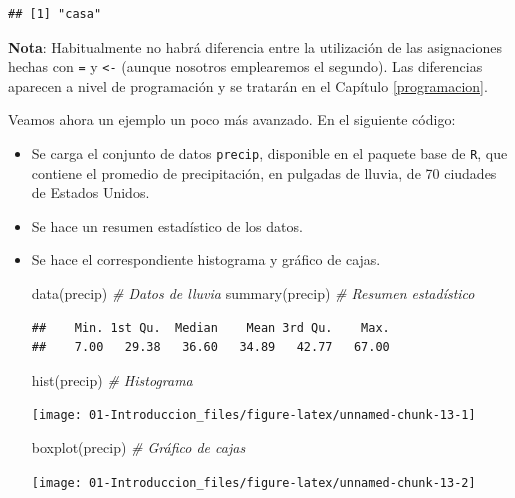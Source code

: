 \documentclass[
]{book}
\newenvironment{Shaded}{\begin{snugshade}}{\end{snugshade}}
\newcommand{\CommentTok}[1]{\textcolor[rgb]{0.56,0.35,0.01}{\textit{#1}}}
\newcommand{\FunctionTok}[1]{\textcolor[rgb]{0.00,0.00,0.00}{#1}}
\newcommand{\NormalTok}[1]{#1}
\theoremstyle{break}
\theoremstyle{nonumberplain}
\begin{document}
\begin{verbatim}
## [1] "casa"
\end{verbatim}

\textbf{Nota}: Habitualmente no habrá diferencia entre la utilización de las asignaciones hechas con \texttt{=} y \texttt{\textless{}-} (aunque nosotros emplearemos el segundo).
Las diferencias aparecen a nivel de programación y se tratarán en el Capítulo \ref{programacion}.

Veamos ahora un ejemplo un poco más avanzado.
En el siguiente código:

\begin{itemize}
\item
  Se carga el conjunto de datos \texttt{precip}, disponible en el paquete base de \texttt{R}, que contiene el promedio de precipitación, en pulgadas de lluvia, de 70 ciudades de Estados Unidos.
\item
  Se hace un resumen estadístico de los datos.
\item
  Se hace el correspondiente histograma y gráfico de cajas.

\begin{Shaded}
\begin{Highlighting}[]
\FunctionTok{data}\NormalTok{(precip)    }\CommentTok{\# Datos de lluvia}
\FunctionTok{summary}\NormalTok{(precip) }\CommentTok{\# Resumen estadístico}
\end{Highlighting}
\end{Shaded}

\begin{verbatim}
##    Min. 1st Qu.  Median    Mean 3rd Qu.    Max. 
##    7.00   29.38   36.60   34.89   42.77   67.00
\end{verbatim}

\begin{Shaded}
\begin{Highlighting}[]
\FunctionTok{hist}\NormalTok{(precip)    }\CommentTok{\# Histograma}
\end{Highlighting}
\end{Shaded}

  \begin{center}\texttt{[image: 01-Introduccion\_files/figure-latex/unnamed-chunk-13-1]} \end{center}

\begin{Shaded}
\begin{Highlighting}[]
\FunctionTok{boxplot}\NormalTok{(precip) }\CommentTok{\# Gráfico de cajas}
\end{Highlighting}
\end{Shaded}

  \begin{center}\texttt{[image: 01-Introduccion\_files/figure-latex/unnamed-chunk-13-2]} \end{center}
\end{itemize}
\end{document}
